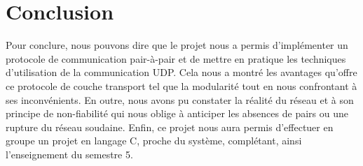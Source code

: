 \documentclass{FR16}
\begin{document}
\section*{Conclusion}
Pour conclure, nous pouvons dire que le projet nous a permis d'implémenter un protocole de communication pair-à-pair et de mettre en pratique les techniques d'utilisation de la communication UDP. Cela nous a montré les avantages qu'offre ce protocole de couche transport tel que la modularité tout en nous confrontant à ses inconvénients. En outre, nous avons pu constater la réalité du réseau et à son principe de non-fiabilité qui nous oblige à anticiper les absences de pairs ou une rupture du réseau soudaine. 
Enfin, ce projet nous aura permis d'effectuer en groupe un projet en langage C, proche du système, complétant, ainsi l'enseignement du semestre 5.
\newpage
\end{document}
